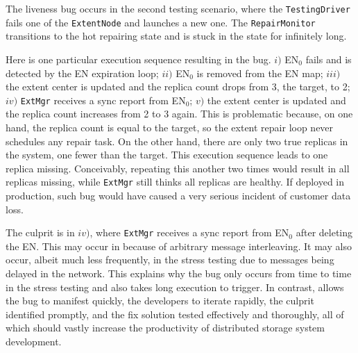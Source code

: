 The liveness bug occurs in the second testing scenario, where the \texttt{TestingDriver} fails one of the \texttt{ExtentNode} and launches a new one. The \texttt{RepairMonitor} transitions to the hot repairing state and is stuck in the state for infinitely long.

Here is one particular execution sequence resulting in the bug. $i)$ EN$_0$ fails and is detected by the EN expiration loop; $ii)$ EN$_0$ is removed from the EN map; $iii)$ the extent center is updated and the replica count drops from 3, the target, to 2; $iv)$ \texttt{ExtMgr} receives a sync report from EN$_0$; $v)$ the extent center is updated and the replica count increases from 2 to 3 again. This is problematic because, on one hand, the replica count is equal to the target, so the extent repair loop never schedules any repair task. On the other hand, there are only two true replicas in the system, one fewer than the target. This execution sequence leads to one replica missing. Conceivably, repeating this another two times would result in all replicas missing, while \texttt{ExtMgr} still thinks all replicas are healthy. If deployed in production, such bug would have caused a very serious incident of customer data loss.

The culprit is in $iv)$, where \texttt{ExtMgr} receives a sync report from EN$_0$ after deleting the EN. This may occur in \psharp because of arbitrary message interleaving. It may also occur, albeit much less frequently, in the stress testing due to messages being delayed in the network. This explains why the bug only occurs from time to time in the stress testing and also takes long execution to trigger. In contrast, \psharp allows the bug to manifest quickly, the developers to iterate rapidly, the culprit identified promptly, and the fix solution tested effectively and thoroughly, all of which should vastly increase the productivity of distributed storage system development. 

